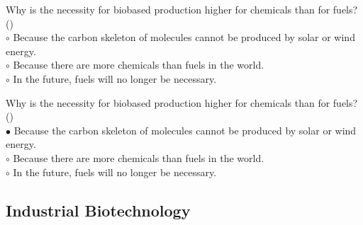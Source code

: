 \documentclass[]{beamer}
\begin{document}
\begin{CJK}{UTF8}{gbsn}
\begin{frame}[shrink] {}
\addtocounter{questions}{1}
\color{blue}
Why is the necessity for biobased production higher for chemicals than for fuels?
({})\\
\color{black}
\setlength{\parindent}{-0.4cm}
{\color{red}$\circ$}  Because the carbon skeleton of molecules cannot be produced by solar or wind energy.   \\
{\color{red}$\circ$} Because there are more chemicals than fuels in the world.  \\
{\color{red}$\circ$} In the future, fuels will no longer be necessary.   \\
\end{frame}
\begin{frame}[shrink] {}
\addtocounter{answers}{1}
\color{blue}
Why is the necessity for biobased production higher for chemicals than for fuels?
({})\\
\color{black}
\setlength{\parindent}{-0.4cm}
{\color{red}$\bullet$} Because the carbon skeleton of molecules cannot be produced by solar or wind energy.   \\
{\color{red}$\circ$} Because there are more chemicals than fuels in the world.  \\
{\color{red}$\circ$} In the future, fuels will no longer be necessary.   \\
\end{frame}


\subsection{ Industrial Biotechnology}
\setcounter{questions}{0}
\setcounter{answers}{0}



\end{CJK}
\end{document}
